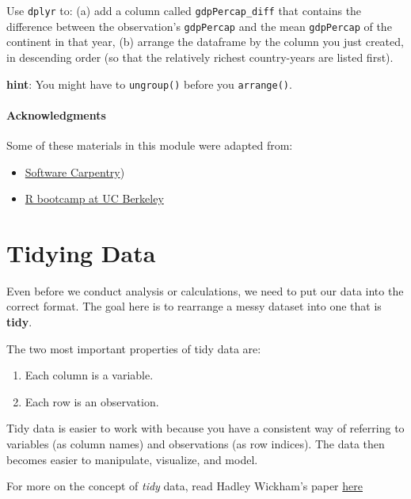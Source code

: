 \documentclass[]{book}
\providecommand{\tightlist}{%
  \setlength{\itemsep}{0pt}\setlength{\parskip}{0pt}}
\begin{document}
Use \texttt{dplyr} to: (a) add a column called \texttt{gdpPercap\_diff}
that contains the difference between the observation's
\texttt{gdpPercap} and the mean \texttt{gdpPercap} of the continent in
that year, (b) arrange the dataframe by the column you just created, in
descending order (so that the relatively richest country-years are
listed first).

\textbf{hint}: You might have to \texttt{ungroup()} before you
\texttt{arrange()}.

\subsubsection*{Acknowledgments}\label{acknowledgments-3}

Some of these materials in this module were adapted from:

\begin{itemize}
\tightlist
\item
  \href{http://swcarpentry.github.io/r-novice-gapminder/}{Software
  Carpentry})
\item
  \href{https://github.com/berkeley-scf/r-bootcamp-fall-2019}{R bootcamp
  at UC Berkeley}
\end{itemize}

\chapter{Tidying Data}\label{tidying-data}

Even before we conduct analysis or calculations, we need to put our data
into the correct format. The goal here is to rearrange a messy dataset
into one that is \textbf{tidy}.

The two most important properties of tidy data are:

\begin{enumerate}
\def\labelenumi{\arabic{enumi})}
\tightlist
\item
  Each column is a variable.
\item
  Each row is an observation.
\end{enumerate}

Tidy data is easier to work with because you have a consistent way of
referring to variables (as column names) and observations (as row
indices). The data then becomes easier to manipulate, visualize, and
model.

For more on the concept of \emph{tidy} data, read Hadley Wickham's paper
\href{http://vita.had.co.nz/papers/tidy-data.html}{here}
\end{document}
